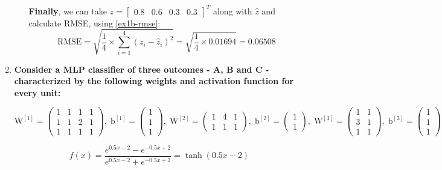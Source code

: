 \documentclass[12pt]{article}
\begin{document}
\begin{enumerate}[leftmargin=\labelsep]
\begin{enumerate}
              \textbf{Finally}, we can take $z = \begin{bmatrix}0.8 & 0.6 & 0.3 & 0.3\end{bmatrix}^T$ along with $\hat{z}$ and calculate RMSE, using \eqref{ex1b-rmse}:
              $$
                  \text{RMSE} = \sqrt{\frac{1}{4} \times \sum_{i = 1}^{4} (z_i - \hat{z}_i)^2} = \sqrt{\frac{1}{4} \times 0.01694} = \mathbf{0.06508}
              $$
    \end{enumerate}

    \item \textbf{Consider a MLP classifier of three outcomes - A, B and C - characterized by the following weights and activation function for every unit:} \\

          \begin{center}
              \vskip -0.3cm
              $\text{W}^{[1]} = \begin{pmatrix} 1 & 1 & 1 & 1 \\ 1 & 1 & 2 & 1 \\ 1 & 1 & 1 & 1\end{pmatrix},\; \text{b}^{[1]} = \begin{pmatrix} 1 \\ 1 \\ 1 \end{pmatrix},\;
              \text{W}^{[2]} = \begin{pmatrix} 1 & 4 & 1 \\ 1 & 1 & 1 \end{pmatrix},\; \text{b}^{[2]} = \begin{pmatrix} 1 \\ 1 \end{pmatrix},\;
              \text{W}^{[3]} = \begin{pmatrix} 1 & 1 \\ 3 & 1 \\ 1 & 1\end{pmatrix},\; \text{b}^{[3]} = \begin{pmatrix} 1 \\ 1 \\ 1 \end{pmatrix}$ \\
          \end{center}

          \[ f\left(x\right) = \frac{{e^{0.5x - 2} - e^{-0.5x + 2}}}{{e^{0.5x - 2} + e^{-0.5x + 2}}} = \tanh\left(0.5x - 2\right) \] \\


\end{enumerate}
\end{document}
